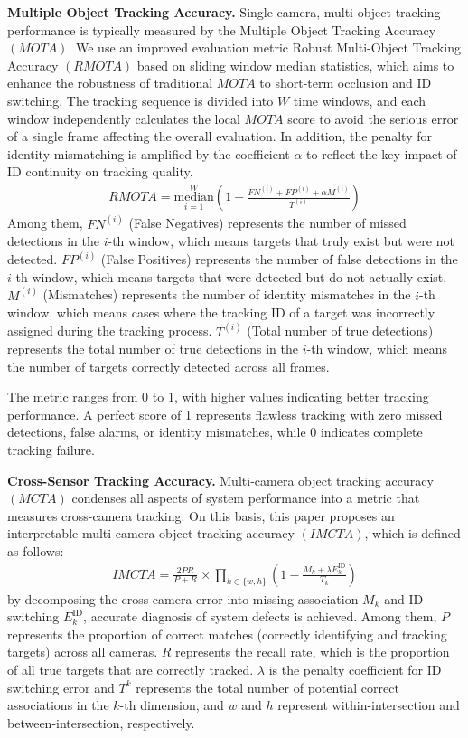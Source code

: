 \documentclass[lettersize,journal]{IEEEtran}
\begin{document}
\textbf{Multiple Object Tracking Accuracy.}
Single-camera, multi-object tracking performance is typically measured by the Multiple Object Tracking Accuracy \((MOTA)\)\cite{Alpher23b}.
We use an improved evaluation metric Robust Multi-Object Tracking Accuracy \((RMOTA)\) based on sliding window median statistics, which aims to enhance the robustness of traditional \(MOTA\) to short-term occlusion and ID switching.
The tracking sequence is divided into \(W\) time windows, and each window independently calculates the local \(MOTA\) score to avoid the serious error of a single frame affecting the overall evaluation.
In addition, the penalty for identity mismatching is amplified by the coefficient \(\alpha\) to reflect the key impact of ID continuity on tracking quality.
\begin{align}
	RMOTA = \underset{i=1}{\overset{W}{\mathrm{median}}} \left(1 - \frac{FN^{(i)} + FP^{(i)} + \alpha M^{(i)}}{T^{(i)}}\right) 
\end{align}
Among them,
\(FN^{(i)}\) (False Negatives) represents the number of missed detections in the \(i\)-th window, which means targets that truly exist but were not detected.
\(FP^{(i)}\) (False Positives) represents the number of false detections in the \(i\)-th window, which means targets that were detected but do not actually exist.
\(M^{(i)}\) (Mismatches) represents the number of identity mismatches in the \(i\)-th window, which means cases where the tracking ID of a target was incorrectly assigned during the tracking process.
\(T^{(i)}\) (Total number of true detections) represents the total number of true detections in the \(i\)-th window, which means the number of targets correctly detected across all frames.

The metric ranges from 0 to 1, with higher values indicating better tracking performance. 
A perfect score of 1 represents flawless tracking with zero missed detections, false alarms, or identity mismatches, while 0 indicates complete tracking failure.

\textbf{Cross-Sensor Tracking Accuracy.}
Multi-camera object tracking accuracy \((MCTA)\)\cite{Alpher23b} condenses all aspects of system performance into a metric that measures cross-camera tracking.
On this basis, this paper proposes an interpretable multi-camera object tracking accuracy \((IMCTA)\), which is defined as follows:
\begin{align}
	IMCTA = {\frac{2PR}{P + R}}_{\text{}} \times \prod_{k \in \{w, h\}} \left(1 - \frac{M_k + \lambda E_k^{\text{ID}}}{T_k}\right)
\end{align}
by decomposing the cross-camera error into missing association \(M_k\) and ID switching \(E_k^{\text{ID}}\), accurate diagnosis of system defects is achieved.
Among them,
\(P\) represents the proportion of correct matches (correctly identifying and tracking targets) across all cameras.  
\(R\) represents the recall rate, which is the proportion of all true targets that are correctly tracked.  
\(\lambda\) is the penalty coefficient for ID switching error and \(T^{k}\) represents the total number of potential correct associations in the \(k\)-th dimension, and \(w\) and \(h\) represent within-intersection and between-intersection, respectively.
\end{document}
